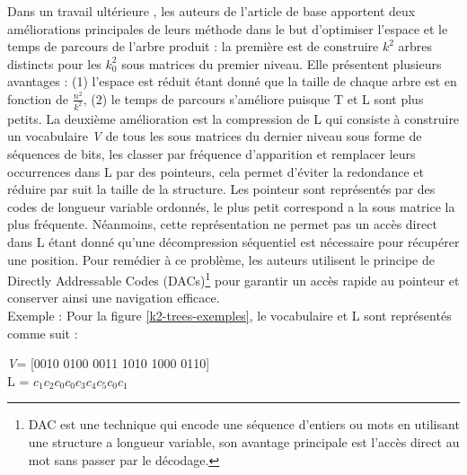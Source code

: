 Dans un travail ultérieure \citep{brisaboa2014compact}, les auteurs de l'article de base apportent deux améliorations principales de leurs méthode dans le but d'optimiser l'espace et le temps de parcours de l'arbre produit : la première est de construire $k^2$ arbres distincts pour les $k_{0}^{2}$ sous matrices du premier niveau. Elle présentent plusieurs avantages : (1) l'espace est réduit étant donné que la taille de chaque arbre est en fonction de $\frac{n^2}{k^2}$, (2) le temps de parcours s'améliore puisque T et L sont plus petits. La deuxième amélioration est la compression de L qui consiste à construire un vocabulaire \textit{V} de tous les sous matrices du dernier niveau sous forme de séquences de bits, les classer par fréquence d'apparition et remplacer leurs occurrences dans L par des pointeurs, cela permet d'éviter la redondance et réduire par suit la taille de la structure. Les pointeur sont représentés par des codes de longueur variable ordonnés, le plus petit correspond a la sous matrice la plus fréquente. Néanmoins, cette représentation ne permet  pas un accès direct dans L étant donné qu'une décompression séquentiel est nécessaire pour récupérer une position. Pour remédier à ce problème, les auteurs utilisent le principe de Directly Addressable Codes (DACs)\footnote{DAC est une technique qui encode une séquence d'entiers ou mots en utilisant une structure a longueur variable, son avantage principale est l'accès direct au mot sans passer par le décodage.} \citep{brisaboa2013dacs} pour garantir un accès rapide au pointeur et conserver ainsi une navigation efficace.\\
Exemple : Pour la figure \ref{k2-trees-exemples}, le vocabulaire et L sont représentés comme suit :\\
\begin{center}
\textit{V}= [0010 0100 0011 1010 1000 0110]\\
L = $c_{1}c_{2}c_{0}c_{0}c_{3}c_{4}c_{5}c_{0}c_{1}$ \\
\end{center}

